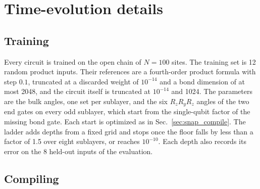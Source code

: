 
\section{Time-evolution details}
\label{app:te_details}

\subsection{Training}

Every circuit is trained on the open chain of $N = 100$ sites. The training set is 12 random product inputs. Their references are a fourth-order product formula with step $0.1$, truncated at a discarded weight of $10^{-14}$ and a bond dimension of at most 2048, and the circuit itself is truncated at $10^{-14}$ and 1024. The parameters are the bulk angles, one set per sublayer, and the six $R_z R_y R_z$ angles of the two end gates on every odd sublayer, which start from the single-qubit factor of the missing bond gate. Each start is optimized as in Sec.~\ref{sec:snap_compile}. The ladder adds depths from a fixed grid and stops once the floor falls by less than a factor of 1.5 over eight sublayers, or reaches $10^{-10}$. Each depth also records its error on the 8 held-out inputs of the evaluation.

\subsection{Compiling}

